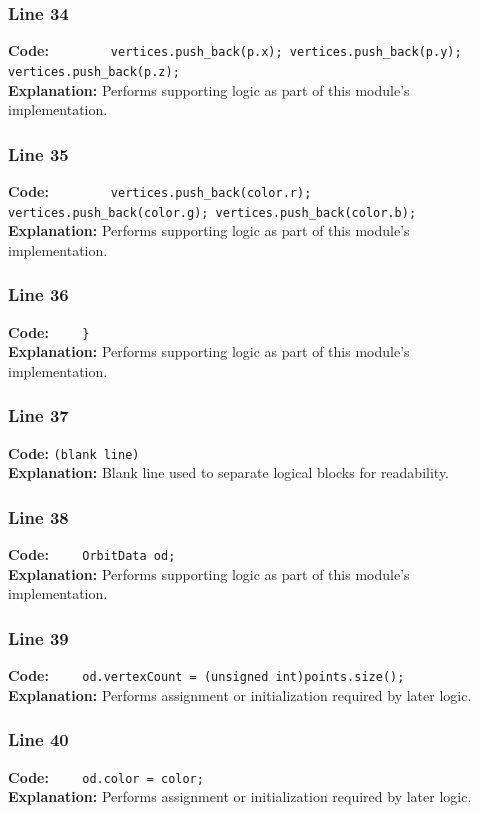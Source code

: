 \documentclass[11pt,a4paper]{article}
\begin{document}
\subsubsection*{Line 34}
\textbf{Code:} \verb|        vertices.push_back(p.x); vertices.push_back(p.y); vertices.push_back(p.z);|\\
\textbf{Explanation:} Performs supporting logic as part of this module's implementation.

\subsubsection*{Line 35}
\textbf{Code:} \verb|        vertices.push_back(color.r); vertices.push_back(color.g); vertices.push_back(color.b);|\\
\textbf{Explanation:} Performs supporting logic as part of this module's implementation.

\subsubsection*{Line 36}
\textbf{Code:} \verb|    }|\\
\textbf{Explanation:} Performs supporting logic as part of this module's implementation.

\subsubsection*{Line 37}
\textbf{Code:} \texttt{(blank line)}\\
\textbf{Explanation:} Blank line used to separate logical blocks for readability.

\subsubsection*{Line 38}
\textbf{Code:} \verb|    OrbitData od;|\\
\textbf{Explanation:} Performs supporting logic as part of this module's implementation.

\subsubsection*{Line 39}
\textbf{Code:} \verb|    od.vertexCount = (unsigned int)points.size();|\\
\textbf{Explanation:} Performs assignment or initialization required by later logic.

\subsubsection*{Line 40}
\textbf{Code:} \verb|    od.color = color;|\\
\textbf{Explanation:} Performs assignment or initialization required by later logic.
\end{document}
